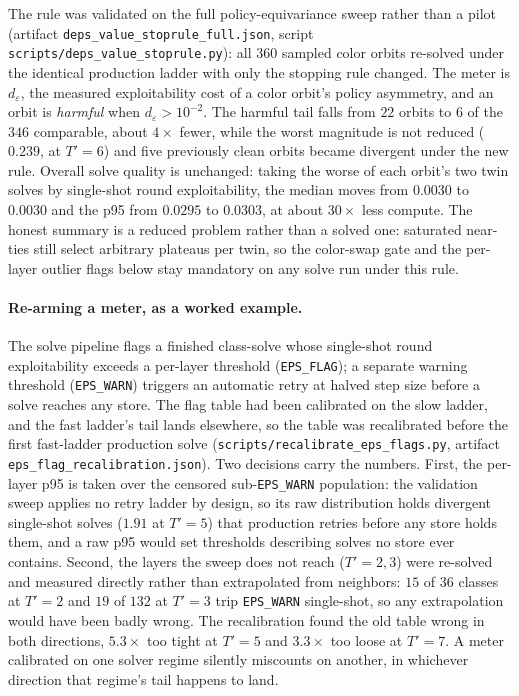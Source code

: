 \documentclass[11pt]{article}
\theoremstyle{plain}
\theoremstyle{definition}
\theoremstyle{remark}
\newcommand{\code}[1]{\texttt{\small #1}}
\begin{document}
The rule was validated on the full policy-equivariance sweep rather
than a pilot (artifact \code{deps\_value\_stoprule\_full.json},
script \code{scripts/deps\_value\_stoprule.py}): all $360$
sampled color orbits re-solved under the identical production ladder
with only the stopping rule changed. The meter is $d_\varepsilon$,
the measured exploitability cost of a color orbit's policy
asymmetry, and an orbit is \emph{harmful} when
$d_\varepsilon>10^{-2}$. The harmful tail falls from $22$ orbits to
$6$ of the $346$ comparable, about $4\times$ fewer, while the worst
magnitude is not reduced ($0.239$, at $T'{=}6$) and five previously
clean orbits became divergent under the new rule. Overall solve
quality is unchanged: taking the worse of each orbit's two twin
solves by single-shot round exploitability, the median moves from
$0.0030$ to $0.0030$ and the p95 from $0.0295$ to $0.0303$, at about
$30\times$ less compute. The honest summary is a reduced problem
rather than a solved one: saturated near-ties still select arbitrary
plateaus per twin, so the color-swap gate and the per-layer outlier
flags below stay mandatory on any solve run under this rule.

\paragraph{Re-arming a meter, as a worked example.} The solve
pipeline flags a finished class-solve whose single-shot round
exploitability exceeds a per-layer threshold (\code{EPS\_FLAG}); a
separate warning threshold (\code{EPS\_WARN}) triggers an automatic
retry at halved step size before a solve reaches any store. The flag
table had been calibrated on the slow ladder, and the fast ladder's
tail lands elsewhere, so the table was recalibrated before the first
fast-ladder production solve
(\code{scripts/recalibrate\_eps\_flags.py}, artifact
\code{eps\_flag\_recalibration.json}). Two decisions
carry the numbers. First, the per-layer p95 is taken over the
censored sub-\code{EPS\_WARN} population: the validation sweep
applies no retry ladder by design, so its raw distribution holds
divergent single-shot solves ($1.91$ at $T'{=}5$) that production
retries before any store holds them, and a raw p95 would set
thresholds describing solves no store ever contains. Second, the
layers the sweep does not reach ($T'{=}2,3$) were re-solved and
measured directly rather than extrapolated from neighbors: $15$ of
$36$ classes at $T'{=}2$ and $19$ of $132$ at $T'{=}3$ trip
\code{EPS\_WARN} single-shot, so any extrapolation would have been
badly wrong. The recalibration found the old table wrong in both
directions, $5.3\times$ too tight at $T'{=}5$ and $3.3\times$ too
loose at $T'{=}7$. A meter calibrated on one solver regime silently
miscounts on another, in whichever direction that regime's tail
happens to land.
\end{document}
